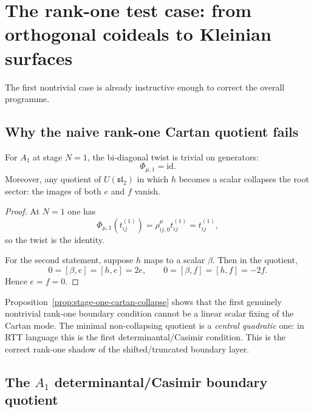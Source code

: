 \section{The rank-one test case: from orthogonal coideals to Kleinian surfaces}
\label{sec:rank-one-test-case}

The first nontrivial case is already instructive enough to correct the overall
programme.

\subsection{Why the naive rank-one Cartan quotient fails}

\begin{proposition}[Stage $N=1$ twist is trivial; naive Cartan fixing collapses the root sector \ClaimStatusProvedHere]
\label{prop:stage-one-cartan-collapse-appendix}
For $A_1$ at stage $N=1$, the bi-diagonal twist is trivial on generators:
\[
\Phi_{\mu,1}=\mathrm{id}.
\]
Moreover, any quotient of $U(\mathfrak{sl}_2)$ in which $h$ becomes a scalar
collapses the root sector: the images of both $e$ and $f$ vanish.
\end{proposition}

\begin{proof}
At $N=1$ one has
\[
\Phi_{\mu,1}(t_{ij}^{(1)})=\rho_{ij,0}^\mu t_{ij}^{(1)}=t_{ij}^{(1)},
\]
so the twist is the identity.

For the second statement, suppose $h$ maps to a scalar $\beta$.  Then in the
quotient,
\[
0=[\beta,e]=[h,e]=2e,
\qquad
0=[\beta,f]=[h,f]=-2f.
\]
Hence $e=f=0$.
\end{proof}

\begin{remark}
\label{rem:first-non-collapsing-boundary-quotient}
Proposition~\ref{prop:stage-one-cartan-collapse} shows that the first genuinely
nontrivial rank-one boundary condition cannot be a linear scalar fixing of the
Cartan mode.  The minimal non-collapsing quotient is a \emph{central quadratic}
one: in RTT language this is the first determinantal/Casimir condition.  This
is the correct rank-one shadow of the shifted/truncated boundary layer.
\end{remark}

\subsection{The $A_1$ determinantal/Casimir boundary quotient}

